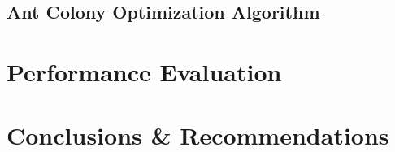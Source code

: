 \documentclass[a4paper]{article}
\begin{document}
\subsection{Ant Colony Optimization Algorithm} %

\section{Performance Evaluation}







\section{Conclusions \& Recommendations}

\end{document}
